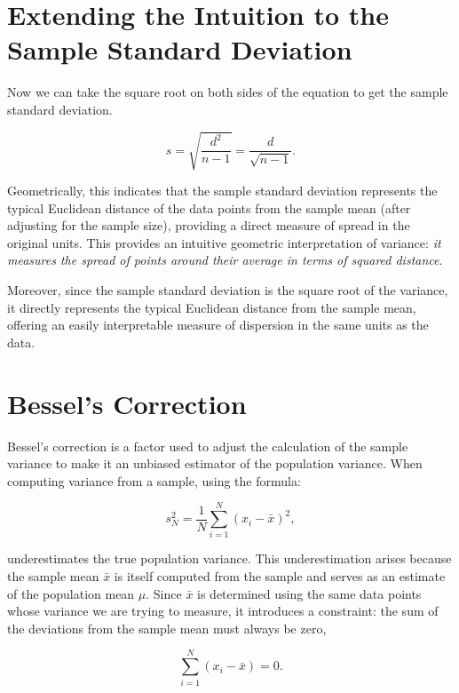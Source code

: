 \documentclass{article}
\begin{document}
\section{Extending the Intuition to the Sample Standard Deviation}

Now we can take the square root on both sides of the equation to get the sample standard deviation.

\begin{equation}
    s = \sqrt{\frac{d^2}{n-1}} = \frac{d}{\sqrt{n-1}}  .
\end{equation}

Geometrically, this indicates that the sample standard deviation represents the typical Euclidean distance of the data points from the sample mean (after adjusting for the sample size), providing a direct measure of spread in the original units. This provides an intuitive geometric interpretation of variance: \emph{it measures the spread of points around their average in terms of squared distance}.

Moreover, since the sample standard deviation is the square root of the variance, it directly represents the typical Euclidean distance from the sample mean, offering an easily interpretable measure of dispersion in the same units as the data.


\section*{Bessel's Correction}


Bessel's correction is a factor used to adjust the calculation of the sample variance to make it an unbiased estimator of the population variance. When computing variance from a sample, using the formula:

\begin{equation}
    s_N^2 = \frac{1}{N} \sum_{i=1}^{N} (x_i - \bar{x})^2,
\end{equation}

underestimates the true population variance. This underestimation arises because the sample mean \( \bar{x} \) is itself computed from the sample and serves as an estimate of the population mean \( \mu \). Since \( \bar{x} \) is determined using the same data points whose variance we are trying to measure, it introduces a constraint: the sum of the deviations from the sample mean must always be zero,

\begin{equation}
    \sum_{i=1}^{N} (x_i - \bar{x}) = 0.
\end{equation}
\end{document}
